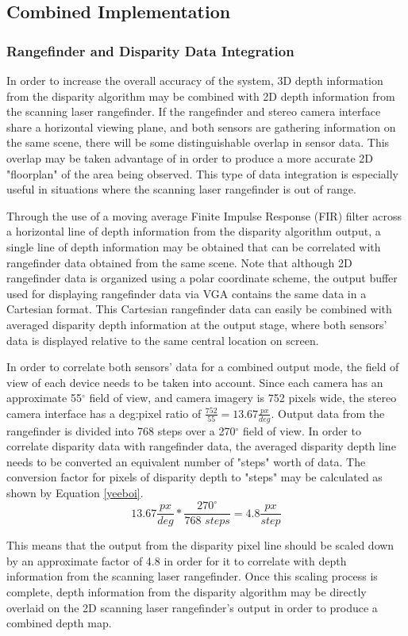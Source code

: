 \subsection{Combined Implementation}
\subsubsection{Rangefinder and Disparity Data Integration}
In order to increase the overall accuracy of the system, 3D depth information from the disparity algorithm may be combined with 2D depth information from the scanning laser rangefinder. If the rangefinder and stereo camera interface share a horizontal viewing plane, and both sensors are gathering information on the same scene, there will be some distinguishable overlap in sensor data. This overlap may be taken advantage of in order to produce a more accurate 2D "floorplan" of the area being observed. This type of data integration is especially useful in situations where the scanning laser rangefinder is out of range.
\par
Through the use of a moving average Finite Impulse Response (FIR) filter across a horizontal line of depth information from the disparity algorithm output, a single line of depth information may be obtained that can be correlated with rangefinder data obtained from the same scene. Note that although 2D rangefinder data is organized using a polar coordinate scheme, the output buffer used for displaying rangefinder data via VGA contains the same data in a Cartesian format. This Cartesian rangefinder data can easily be combined with averaged disparity depth information at the output stage, where both sensors' data is displayed relative to the same central location on screen. 
\par
In order to correlate both sensors' data for a combined output mode, the field of view of each device needs to be taken into account. Since each camera has an approximate 55$^\circ$ field of view, and camera imagery is 752 pixels wide, the stereo camera interface has a deg:pixel ratio of $\frac{752}{55}=13.67\frac{px}{deg}$. Output data from the rangefinder is divided into 768 steps over a 270$^\circ$ field of view. In order to correlate disparity data with rangefinder data, the averaged disparity depth line needs to be converted an equivalent number of "steps" worth of data. The conversion factor for pixels of disparity depth to "steps" may be calculated as shown by Equation \ref{yeeboi}.
\begin{equation} \label{yeeboi}
13.67\frac{px}{deg}*\frac{270^\circ}{768\,\,steps} = 4.8\frac{px}{step}
\end{equation}
\par
This means that the output from the disparity pixel line should be scaled down by an approximate factor of 4.8 in order for it to correlate with depth information from the scanning laser rangefinder. Once this scaling process is complete, depth information from the disparity algorithm may be directly overlaid on the 2D scanning laser rangefinder's output in order to produce a combined depth map. 

